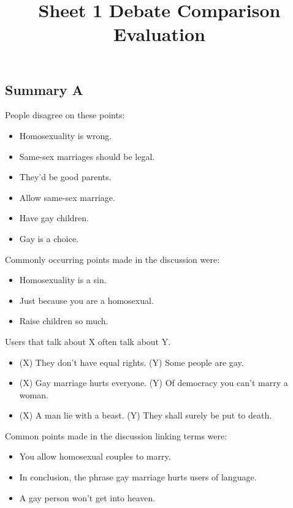 \documentclass[tikz]{article}
\title{\textbf{Sheet 1} Debate Comparison Evaluation\vspace{-9ex}}
\date{}
\begin{document}
  \maketitle

  \begin{multicols}{2}
    \subsection*{Summary A}
    People disagree on these points:
    \begin{itemize}[noitemsep,nolistsep,label={}]
      \item{Homosexuality is wrong.}
      \item{Same-sex marriages should be legal.}
      \item{They'd be good parents.}
      \item{Allow same-sex marriage.}
      \item{Have gay children.}
      \item{Gay is a choice.}
    \end{itemize}

    Commonly occurring points made in the discussion were:
    \begin{itemize}[noitemsep,nolistsep,label={}]
      \item{Homosexuality is a sin.}
      \item{Just because you are a homosexual.}
      \item{Raise children so much.}
    \end{itemize}

    Users that talk about X often talk about Y.
    \begin{itemize}[noitemsep,nolistsep,label={}]
      \item{(X) They don't have equal rights. (Y) Some people are gay.}
      \item{(X) Gay marriage hurts everyone. (Y) Of democracy you can't marry a woman.}
      \item{(X) A man lie with a beast. (Y) They shall surely be put to death.}
    \end{itemize}

    Common points made in the discussion linking terms were:
    \begin{itemize}[noitemsep,nolistsep,label={}]
      \item{You allow homosexual couples to marry.}
      \item{In conclusion, the phrase gay marriage hurts users of language.}
      \item{A gay person won't get into heaven.}
    \end{itemize}


\end{multicols}
\end{document}
